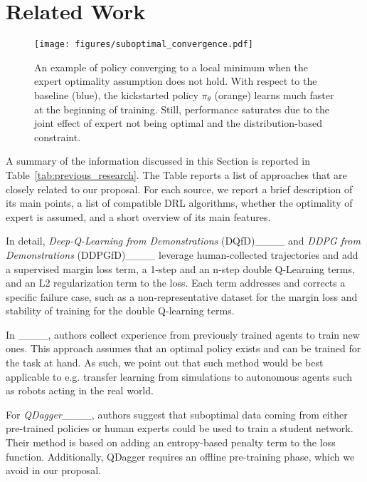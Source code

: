 \section{Related Work}
\begin{figure}
    \centering
    \texttt{[image: figures/suboptimal\_convergence.pdf]}
    \caption{An example of policy converging to a local minimum when the expert optimality assumption does not hold. With respect to the baseline (blue), the kickstarted policy $\pi_{\theta}$ (orange) learns much faster at the beginning of training. Still, performance saturates due to the joint effect of expert not being optimal and the distribution-based constraint.}
    \label{fig:local_minimum}
\end{figure}
A summary of the information discussed in this Section is reported in Table~\ref{tab:previous_research}. The Table reports a list of approaches that are closely related to our proposal. For each source, we report a brief description of its main points, a list of compatible DRL algorithms, whether the optimality of expert is assumed, and a short overview of its main features.

In detail, {\em Deep-Q-Learning from Demonstrations} (DQfD)____ and {\em DDPG from Demonstrations} (DDPGfD)____ leverage human-collected trajectories and add a supervised margin loss term, a 1-step and an n-step double Q-Learning terms, and an L2 regularization term to the loss. Each term addresses and corrects a specific failure case, such as a non-representative dataset for the margin loss and stability of training for the double Q-learning terms.

In ____, authors collect experience from previously trained agents to train new ones. This approach assumes that an optimal policy exists and can be trained for the task at hand. As such, we point out that such method would be best applicable to e.g. transfer learning from simulations to autonomous agents such as robots acting in the real world. 

For {\em QDagger}____, authors suggest that suboptimal data coming from either pre-trained policies or human experts could be used to train a student network. Their method is based on adding an entropy-based penalty term to the loss function. Additionally, QDagger requires an offline pre-training phase, which we avoid in our proposal.

